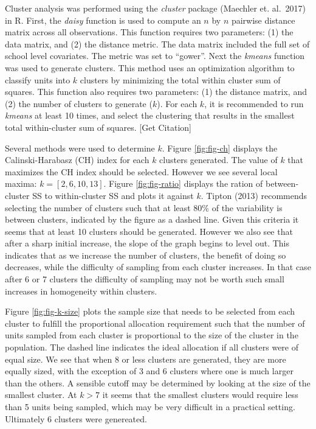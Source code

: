 \documentclass[man,floatsintext]{apa6}
\theoremstyle{definition}
\theoremstyle{definition}
\theoremstyle{definition}
\theoremstyle{remark}
\begin{document}
Cluster analysis was performed using the \emph{cluster} package
(Maechler et. al.~2017) in R. First, the \emph{daisy} function is used
to compute an \(n\) by \(n\) pairwise distance matrix across all
observations. This function requires two parameters: (1) the data
matrix, and (2) the distance metric. The data matrix included the full
set of school level covariates. The metric was set to \enquote{gower}.
Next the \emph{kmeans} function was used to generate clusters. This
method uses an optimization algorithm to classify units into \(k\)
clusters by minimizing the total within cluster sum of squares. This
function also requires two parameters: (1) the distance matrix, and (2)
the number of clusters to generate (\(k\)). For each \(k\), it is
recommended to run \emph{kmeans} at least 10 times, and select the
clustering that results in the smallest total within-cluster sum of
squares. {[}Get Citation{]}

Several methods were used to determine \(k\). Figure \ref{fig:fig-ch}
displays the Calinski-Harabasz (CH) index for each \(k\) clusters
generated. The value of \(k\) that maximizes the CH index should be
selected. However we see several local maxima: \(k = [2, 6, 10, 13]\).
Figure \ref{fig:fig-ratio} displays the ration of between-cluster SS to
within-cluster SS and plots it against \(k\). Tipton (2013) recommends
selecting the number of clusters such that at least 80\% of the
variability is between clusters, indicated by the figure as a dashed
line. Given this criteria it seems that at least 10 clusters should be
generated. However we also see that after a sharp initial increase, the
slope of the graph begins to level out. This indicates that as we
increase the number of clusters, the benefit of doing so decreases,
while the difficulty of sampling from each cluster increases. In that
case after 6 or 7 clusters the difficulty of sampling may not be worth
such small increases in homogeneity within clusters.

Figure \ref{fig:fig-k-size} plots the sample size that needs to be
selected from each cluster to fulfill the proportional allocation
requirement such that the number of units sampled from each cluster is
proportional to the size of the cluster in the population. The dashed
line indicates the ideal allocation if all clusters were of equal size.
We see that when 8 or less clusters are generated, they are more equally
sized, with the exception of 3 and 6 clusters where one is much larger
than the others. A sensible cutoff may be determined by looking at the
size of the smallest cluster. At \(k > 7\) it seems that the smallest
clusters would require less than 5 units being sampled, which may be
very difficult in a practical setting. Ultimately 6 clusters were
genereated.
\end{document}
